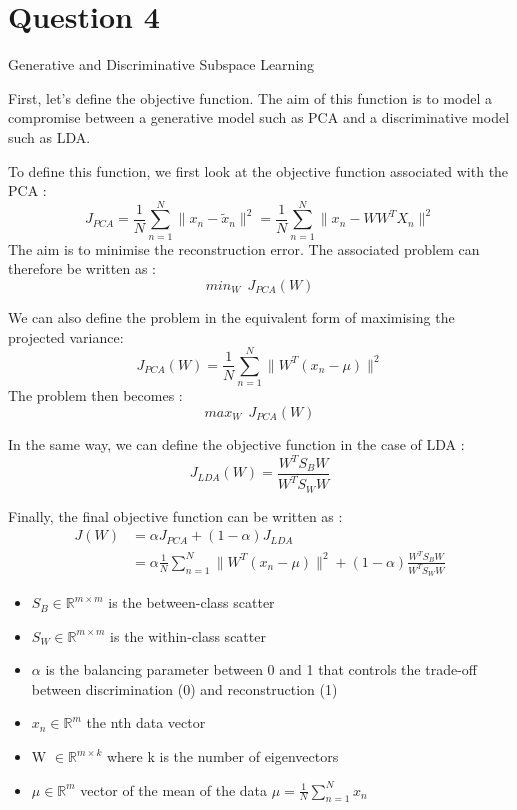 \clearpage

\vspace{-2em}
\section{Question 4} Generative and Discriminative Subspace Learning
\newline


First, let's define the objective function. The aim of this function is to model a compromise between a generative model such as PCA and a discriminative model such as LDA.

To define this function, we first look at the objective function associated with the PCA : 
$$ J_{PCA} = \frac{1}{N} \sum_{n = 1}^{N} {\lVert x_n - \tilde{x}_n \rVert ^2} = \frac{1}{N} \sum_{n = 1}^{N}{\lVert x_n - WW^TX_n \rVert^2} $$ 
The aim is to minimise the reconstruction error.  The associated problem can therefore be written as : 
$$ min_W\ \ J_{PCA}(W) $$

We can also define the problem in the equivalent form of maximising the projected variance:
$$ J_{PCA}(W) =  \frac{1}{N} \sum_{n = 1}^{N}{\lVert W^T(x_n - \mu) \rVert^2} $$
The problem then becomes : 
$$ max_W\ \ J_{PCA}(W) $$

In the same way, we can define the objective function in the case of LDA :
$$ J_{LDA}(W) = \dfrac{W^TS_BW}{W^TS_WW} $$

Finally, the final objective function can be written as :
\begin{align*}
	J(W) &= \alpha J_{PCA} + (1 - \alpha) J_{LDA} \\
	&= \alpha \frac{1}{N} \sum_{n = 1}^{N} \lVert W^T(x_n - \mu) \rVert^2 + (1 - \alpha) \frac{W^T S_B W}{W^T S_W W}
\end{align*}

\begin{itemize}
	\item $S_B \in \mathbb{R}^{m \times m}$ is the between-class scatter
	\item $S_W \in \mathbb{R}^{m \times m}$ is the within-class scatter
	\item $\alpha$ is the balancing parameter between 0 and 1 that controls the trade-off between discrimination (0) and reconstruction (1)
	\item $x_n \in \mathbb{R}^{m}$ the nth data vector
	\item W $\in \mathbb{R}^{m \times k}$  where k is the number of eigenvectors
	\item $\mu \in \mathbb{R}^{m}$ vector of the mean of the data  $\mu = \frac{1}{N} \sum_{n = 1}^{N} x_n $ 
\end{itemize}


